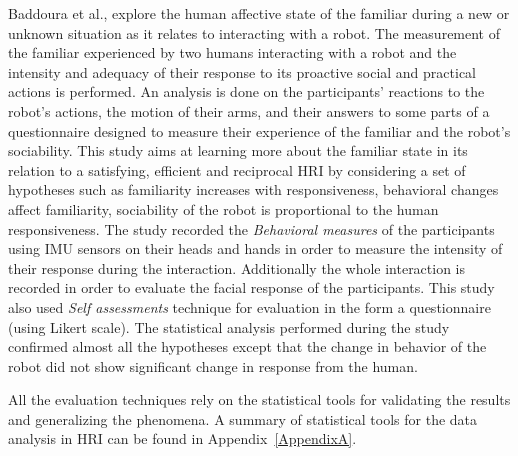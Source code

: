 	Baddoura et al.,\cite{Baddoura2013} explore the human affective state of the familiar during a new or unknown situation as it relates to interacting with a robot. The measurement of the familiar experienced by two humans interacting with a robot and the intensity and adequacy of their response to its proactive social and practical actions is performed. An analysis is done on the participants’ reactions to the robot’s actions, the motion of their arms, and their answers to some parts of a questionnaire designed to measure their experience of the familiar and the robot’s sociability. This study aims at learning more about the familiar state in its relation to a satisfying, efficient and reciprocal HRI by considering a set of hypotheses such as familiarity increases with responsiveness,  behavioral changes affect familiarity, sociability of the robot is proportional to the human responsiveness. The study recorded the \emph{Behavioral measures} of the participants using IMU sensors on their heads and hands in order to measure the intensity of their response during the interaction. Additionally the whole interaction is recorded in order to evaluate the facial response of the participants. This study also used \emph{Self assessments} technique for evaluation in the form a questionnaire (using Likert scale). The statistical analysis performed during the study confirmed almost all the hypotheses except that the change in behavior of the robot did not show significant change in response from the human.
	
	All the evaluation techniques rely on the statistical tools for validating the results and generalizing the phenomena. A summary of statistical tools for the data analysis in HRI can be found in Appendix~\ref{AppendixA}.